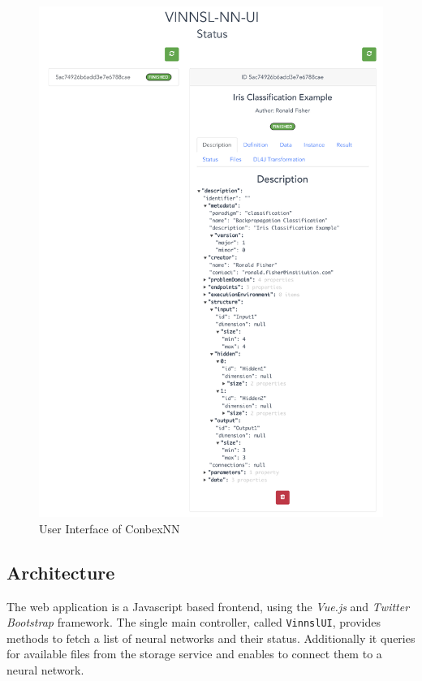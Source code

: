 \begin{figure}
\centering
\includegraphics[width=15.00000cm]{images/VINNSL-NN-UI}
\caption{User Interface of ConbexNN \label{img.vinnsl-nn-ui}}
\end{figure}

\subsection{Architecture}\label{architecture}

The web application is a Javascript based frontend, using the
\emph{Vue.js} and \emph{Twitter Bootstrap} framework. The single main
controller, called \texttt{VinnslUI}, provides methods to fetch a list
of neural networks and their status. Additionally it queries for
available files from the storage service and enables to connect them to
a neural network.

